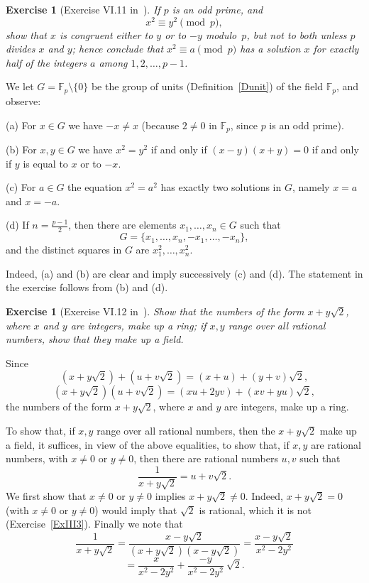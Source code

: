 \documentclass[12pt,letterpaper]{article}
\newcommand{\F}{\mathbb{F}}
\newtheorem{exer}[thm]{Exercise}
\theoremstyle{definition}
\begin{document}
\begin{exer}[Exercise VI.11 in~\cite{weil1979}]\label{ExVI11}
If $p$ is an odd prime, and 
$$
x^2\equiv y^2\pmod p,
$$ 
show that $x$ is congruent either to $y$ or to $-y$ modulo~$p$, but not to both unless $p$ divides $x$ and $y$; hence conclude that $x^2\equiv a\pmod p$ has a solution $x$ for exactly half of the integers $a$ among $1,2,\ldots,p-1$.
\end{exer}

We let $G=\F_p\setminus\{0\}$ be the group of units (Definition~\ref{Dunit}) of the field $\F_p$, and observe: 

(a) For $x\in G$ we have $-x\ne x$ (because $2\ne0$ in $\F_p$, since $p$ is an odd prime). 

(b) For $x,y\in G$ we have $x^2=y^2$ if and only if $(x-y)(x+y)=0$ if and only if $y$ is equal to $x$ or to $-x$. 

(c) For $a\in G$ the equation $x^2=a^2$ has exactly two solutions in $G$, namely $x=a$ and $x=-a$. 

(d) If $n=\frac{p-1}{2}$, then there are elements $x_1,\ldots, x_n\in G$ such that 
$$
G=\{x_1,\ldots, x_n,-x_1,\ldots,-x_n\},
$$ 
and the distinct squares in $G$ are $x_1^2,\ldots, x_n^2$. 

Indeed, (a) and (b) are clear and imply successively (c) and (d). The statement in the exercise follows from (b) and (d). 

\begin{exer}[Exercise VI.12 in~\cite{weil1979}]\label{ExVI12}
Show that the numbers of the form $x+y\sqrt{2}$, where $x$ and $y$ are integers, make up a ring; if $x,y$ range over all rational numbers, show that they make up a field.
\end{exer} 

Since 
$$
(x+y\sqrt{2})+(u+v\sqrt{2})=(x+u)+(y+v)\sqrt{2},
$$ 
$$
(x+y\sqrt{2})(u+v\sqrt{2})=(xu+2yv)+(xv+yu)\sqrt{2},
$$ 
the numbers of the form $x+y\sqrt{2}$, where $x$ and $y$ are integers, make up a ring. 

To show that, if $x,y$ range over all rational numbers, then the $x+y\sqrt{2}$ make up a field, it suffices, in view of the above equalities, to show that, if $x,y$ are rational numbers, with $x\ne0$ or $y\ne0$, then there are rational numbers $u, v$ such that 
$$
\frac{1}{x+y\sqrt{2}}=u+v\sqrt{2}.
$$ 
We first show that $x\ne0$ or $y\ne0$ implies $x+y\sqrt{2}\ne0$. Indeed, $x+y\sqrt{2}=0$ (with $x\ne0$ or $y\ne0$) would imply that $\sqrt{2}$ is rational, which it is not (Exercise~\ref{ExIII3}). Finally we note that
$$
\frac{1}{x+y\sqrt{2}}=\frac{x-y\sqrt{2}}{(x+y\sqrt{2})(x-y\sqrt{2})}=\frac{x-y\sqrt{2}}{x^2-2y^2}
$$ 
$$
=\frac{x}{x^2-2y^2}+\frac{-y}{x^2-2y^2}\ \sqrt{2}.
$$ 
\end{document}
